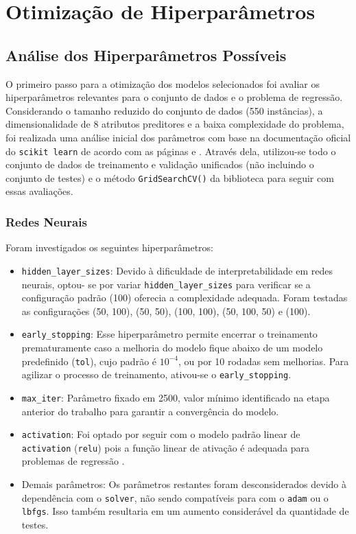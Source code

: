 \documentclass{report}
\let\oldsection\section
\renewcommand\section{\clearpage\oldsection}
\begin{document}
\section{Otimização de Hiperparâmetros} \label{sec: 5.1}

\subsection{Análise dos Hiperparâmetros Possíveis}

O primeiro passo para a otimização dos modelos selecionados foi avaliar os hiperparâmetros relevantes para o conjunto de dados e o problema de regressão. Considerando o tamanho reduzido do conjunto de dados
(550 instâncias), a dimensionalidade de 8 atributos preditores e a baixa complexidade do problema, foi realizada uma análise inicial dos parâmetros com base na documentação oficial do \texttt{scikit learn}
de acordo com as páginas \cite{RFR} e \cite{Regression}. Através dela, utilizou-se todo o conjunto de dados de treinamento e validação unificados (não incluindo o conjunto de testes) e o método \texttt{GridSearchCV()}
da biblioteca para seguir com essas avaliações.
\subsubsection{Redes Neurais}

Foram investigados os seguintes hiperparâmetros:
\begin{itemize}
    \item \texttt{hidden\_layer\_sizes}:
    Devido à dificuldade de interpretabilidade em redes neurais, optou-
    se por variar \texttt{hidden\_layer\_sizes} para verificar se a configuração padrão (100) oferecia a complexidade adequada. Foram testadas as configurações (50, 100), (50, 50), (100, 100), (50, 100, 50) e (100).
    \item \texttt{early\_stopping}:
    Esse hiperparâmetro permite encerrar o treinamento prematuramente caso a melhoria do modelo fique abaixo de um modelo predefinido (\texttt{tol}), cujo padrão é ${10^{-4}}$, ou por 10 rodadas sem melhorias. Para agilizar o processo de treinamento, ativou-se o \texttt{early\_stopping}.
    \item \texttt{max\_iter}:
    Parâmetro fixado em 2500, valor mínimo identificado na etapa anterior do trabalho para garantir a convergência do modelo.
    \item \texttt{activation}:
    Foi optado por seguir com o modelo padrão linear de \texttt{activation} (\texttt{relu}) pois a função linear de ativação é adequada para problemas de regressão \cite{AF}.
    \item Demais parâmetros:
    Os parâmetros restantes foram desconsiderados devido à dependência com o \texttt{solver}, não sendo compatíveis para com o \texttt{adam} ou o \texttt{lbfgs}. Isso também resultaria em um aumento considerável da quantidade de testes.
\end{itemize}
\end{document}
